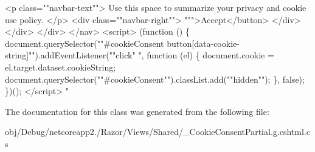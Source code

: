 \begin{DoxyCode}
                <p \textcolor{keyword}{class}=\textcolor{stringliteral}{""}navbar-text\textcolor{stringliteral}{""}>
                    Use \textcolor{keyword}{this} space to summarize your privacy and cookie use policy.
                </p>
                <div \textcolor{keyword}{class}=\textcolor{stringliteral}{""}navbar-right\textcolor{stringliteral}{""}>
                    \textcolor{stringliteral}{""}\textcolor{stringliteral}{">Accept</button>}
\textcolor{stringliteral}{                </div>}
\textcolor{stringliteral}{            </div>}
\textcolor{stringliteral}{        </div>}
\textcolor{stringliteral}{    </nav>}
\textcolor{stringliteral}{    <script>}
\textcolor{stringliteral}{        (function () \{}
\textcolor{stringliteral}{            document.querySelector("}\textcolor{stringliteral}{"#cookieConsent button[data-cookie-string]"}\textcolor{stringliteral}{").addEventListener("}\textcolor{stringliteral}{"click"}\textcolor{stringliteral}{
      ", function (el) \{}
\textcolor{stringliteral}{                document.cookie = el.target.dataset.cookieString;}
\textcolor{stringliteral}{                document.querySelector("}\textcolor{stringliteral}{"#cookieConsent"}\textcolor{stringliteral}{").classList.add("}\textcolor{stringliteral}{"hidden"}\textcolor{stringliteral}{");}
\textcolor{stringliteral}{            \}, false);}
\textcolor{stringliteral}{        \})();}
\textcolor{stringliteral}{    </script>}
\textcolor{stringliteral}{"}
\end{DoxyCode}


The documentation for this class was generated from the following file\+:\begin{DoxyCompactItemize}
\item 
obj/\+Debug/netcoreapp2./\+Razor/\+Views/\+Shared/\+\_\+\+Cookie\+Consent\+Partial.\+g.\+cshtml.\+cs\end{DoxyCompactItemize}

